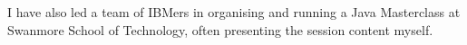 \documentclass[10pt,stdletter,dateno,sigleft]{newlfm} %
\begin{document}
\begin{newlfm}
I have also led a team of IBMers in organising and running a Java Masterclass
at Swanmore School of Technology, often presenting the session content myself.



 


\end{newlfm}
\end{document}
